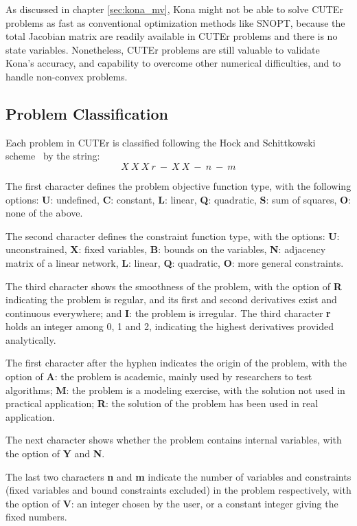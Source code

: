 As discussed in chapter \ref{sec:kona_mv}, Kona might not be able to solve CUTEr problems as fast as conventional optimization methods like SNOPT, because the total Jacobian matrix are readily available in CUTEr problems and there is no state variables.  Nonetheless, CUTEr problems are still valuable to validate Kona's accuracy, and capability to overcome other numerical difficulties, and to handle non-convex problems. 

\subsection{Problem Classification}
Each problem in CUTEr is classified following the Hock and Schittkowski scheme~\cite{cuterScheme} by the string: 
\begin{equation*}
X \ X \ X \ r \ - \ X \ X \ - \ n \ - \ m
\end{equation*}

The first character defines the problem objective function type, with the following options: 
\textbf{U}: undefined, \textbf{C}: constant, \textbf{L}: linear, \textbf{Q}: quadratic, \textbf{S}: sum of squares, \textbf{O}: none of the above. 

The second character defines the constraint function type, with the options: 
\textbf{U}: unconstrained, \textbf{X}: fixed variables, \textbf{B}: bounds on the variables, \textbf{N}: adjacency matrix of a linear network, \textbf{L}: linear, \textbf{Q}: quadratic, \textbf{O}: more general constraints. 

The third character shows the smoothness of the problem, with the option of \textbf{R} indicating the problem is regular, and its first and second derivatives exist and continuous everywhere; and \textbf{I}: the problem is irregular. The third character \textbf{r} holds an integer among 0, 1 and 2, indicating the highest derivatives provided analytically.

The first character after the hyphen indicates the origin of the problem, with the option of \textbf{A}: the problem is academic, mainly used by researchers to test algorithms; \textbf{M}: the problem is a modeling exercise, with the solution not used in practical application; \textbf{R}: the solution of the problem has been used in real application.  

The next character shows whether the problem contains internal variables, with the option of \textbf{Y} and \textbf{N}. 

The last two characters \textbf{n} and \textbf{m} indicate the number of variables and constraints (fixed variables and bound constraints excluded) in the problem respectively, with the option of \textbf{V}: an integer chosen by the user, or a constant integer giving the fixed numbers. 

